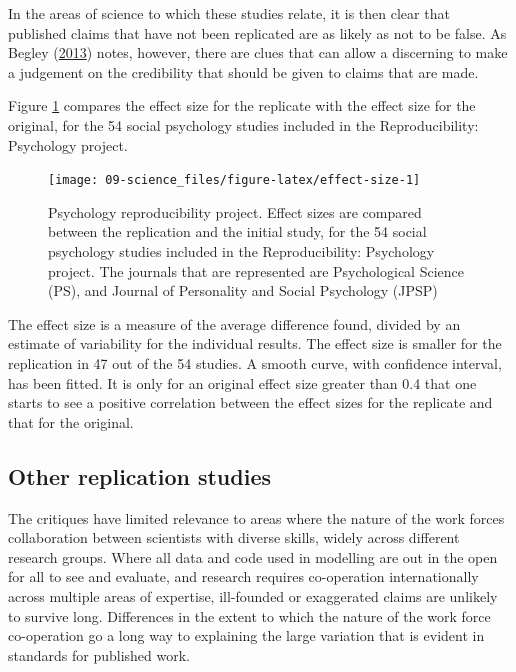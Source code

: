 \documentclass[
  10pt,
  b5paper]{book}
\begin{document}
In the areas of science to which these studies relate,
it is then clear that published claims that have not
been replicated are as likely as not to be false. As
Begley (\protect\hyperlink{ref-r2_begley_2013}{2013}) notes, however, there are clues that
can allow a discerning to make a judgement on the
credibility that should be given to claims that are
made.

Figure \ref{fig:effect-size} compares the effect size
for the replicate with the effect size for the original,
for the 54 social psychology studies included in the
Reproducibility: Psychology project.

\begin{figure}[H]

{\centering \texttt{[image: 09-science\_files/figure-latex/effect-size-1]} 

}

\caption{Psychology reproducibility project. Effect sizes are
compared between the replication and the initial study, for the 
54 social psychology studies included in the Reproducibility:
Psychology project. The journals that are represented are 
Psychological Science (PS), and Journal of Personality and 
Social Psychology (JPSP)}\label{fig:effect-size}
\end{figure}

The effect size is a measure of the average difference found,
divided by an estimate of variability for the individual
results. The effect size is smaller for the replication in 47
out of the 54 studies. A smooth curve, with confidence interval,
has been fitted. It is only for an original effect size
greater than 0.4 that one starts to see a positive correlation
between the effect sizes for the replicate and that for the
original.

\hypertarget{other-replication-studies}{%
\subsection*{Other replication studies}\label{other-replication-studies}}

The critiques have limited relevance to areas where the nature
of the work forces collaboration between scientists with
diverse skills, widely across different research groups.
Where all data and code used in modelling are out in the open
for all to see and evaluate, and research requires co-operation
internationally across multiple areas of expertise, ill-founded
or exaggerated claims are unlikely to survive long. Differences
in the extent to which the nature of the work force co-operation
go a long way to explaining the large variation that is evident
in standards for published work.
\end{document}
